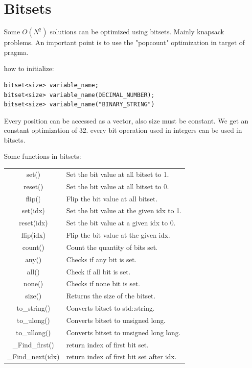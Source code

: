 

\section{Bitsets}
Some $O(N^2)$ solutions can be optimized using bitsets. Mainly knapsack problems.
An important point is to use the "popcount" optimization  in target of pragma.

how to initialize:

\begin{lstlisting}
bitset<size> variable_name;
bitset<size> variable_name(DECIMAL_NUMBER);
bitset<size> variable_name("BINARY_STRING")
\end{lstlisting}

Every position can be accessed as a vector, also size must be constant. We get an constant optimization of 32. every bit operation used in integers can be used in bitsets.

Some functions in bitsets:
\begin{center}
\begin{tabular}{ c | l }
  set()  & Set the bit value at all bitset to 1.  \\ 
 reset() & Set the bit value at all bitset to 0.  \\  
 flip() & Flip the bit value at all bitset.\\
 set(idx) & Set the bit value at the given idx to 1.  \\ 
 reset(idx) & Set the bit value at a given idx to 0.  \\  
 flip(idx) & Flip the bit value at the given idx.\\
 count() & Count the quantity of bits set.\\  
 any() & Checks if any bit is set.\\
 all() & Check if all bit is set.\\
 none() & Checks if none bit is set.\\
 size() & Returns the size of the bitset.\\
 to\_string() & Converts bitset to std::string.\\
 to\_ulong() & Converts bitset to unsigned long.\\
 to\_ullong() & Converts bitset to unsigned long long.\\
 \_Find\_first() & return index of first bit set. \\
 \_Find\_next(idx) & return index of first bit set after idx.
\end{tabular}
\end{center}

